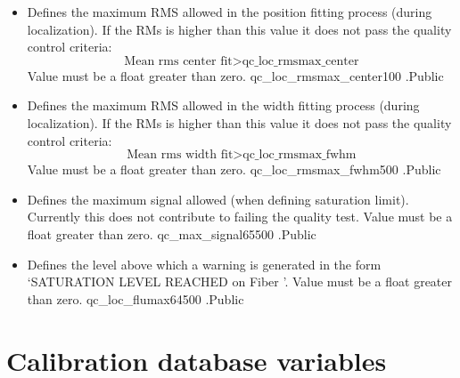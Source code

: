 \begin{itemize}
\item {}
{Defines the maximum RMS allowed in the position fitting process (during localization). If the RMs is higher than this value it does not pass the quality control criteria: 
\begin{equation}
\text{Mean rms center fit} > \text{qc\_loc\_rmsmax\_center}
\end{equation}
Value must be a float greater than zero.
}
{qc\_loc\_rmsmax\_center}{100}
{\callocRAW}{\constantsfile}{\callocRAW.\progMAIN}{Public}


\item {}
{Defines the maximum RMS allowed in the width fitting process (during localization). If the RMs is higher than this value it does not pass the quality control criteria: 
\begin{equation}
\text{Mean rms width fit} > \text{qc\_loc\_rmsmax\_fwhm}
\end{equation}
Value must be a float greater than zero.
}
{qc\_loc\_rmsmax\_fwhm}{500}
{\callocRAW}{\constantsfile}{\callocRAW.\progMAIN}{Public}


\item {}
{Defines the maximum signal allowed (when defining saturation limit). Currently this does not contribute to failing the quality test. Value must be a float greater than zero.}
{qc\_max\_signal}{65500}
{\calFFraw}{\constantsfile}{\calFFraw.\progMAIN}{Public}

\item {}
{Defines the level above which a warning is generated in the form `SATURATION LEVEL REACHED on Fiber '. Value must be a float greater than zero.}
{qc\_loc\_flumax}{64500}
{\calFFraw}{\constantsfile}{\calFFraw.\progMAIN}{Public}

\end{itemize}


\clearpage
\newpage
\section{Calibration database variables}
\label{ch:variables:calibdb}

